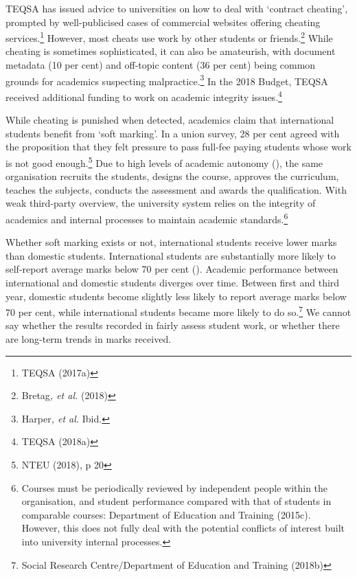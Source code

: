 \documentclass{grattan}
\begin{document}
TEQSA has issued advice to universities on how to deal with `contract cheating', prompted by well-publicised cases of commercial websites offering cheating services.\footnote{TEQSA (2017a)} However, most cheats use work by other students or friends.\footnote{Bretag\emph{, et al.} (2018)} While cheating is sometimes sophisticated, it can also be amateurish, with document metadata (10 per cent) and off-topic content (36 per cent) being common grounds for academics suspecting malpractice.\footnote{Harper\emph{, et al.} Ibid.} In the 2018 Budget, TEQSA received additional funding to work on academic integrity issues.\footnote{TEQSA (2018a)}

While cheating is punished when detected, academics claim that international students benefit from `soft marking'. In a union survey, 28 per cent agreed with the proposition that they felt pressure to pass full-fee paying students whose work is not good enough.\footnote{NTEU (2018), p 20} Due to high levels of academic autonomy (), the same organisation recruits the students, designs the course, approves the curriculum, teaches the subjects, conducts the assessment and awards the qualification. With weak third-party overview, the university system relies on the integrity of academics and internal processes to maintain academic standards.\footnote{Courses must be periodically reviewed by independent people within the organisation, and student performance compared with that of students in comparable courses: Department of Education and Training (2015c). However, this does not fully deal with the potential conflicts of interest built into university internal processes.}

Whether soft marking exists or not, international students receive lower marks than domestic students. International students are substantially more likely to self-report average marks below 70 per cent (). Academic performance between international and domestic students diverges over time. Between first and third year, domestic students become slightly less likely to report average marks below 70 per cent, while international students became more likely to do so.\footnote{Social Research Centre/Department of Education and Training (2018b)} We cannot say whether the results recorded in  fairly assess student work, or whether there are long-term trends in marks received.
\end{document}
